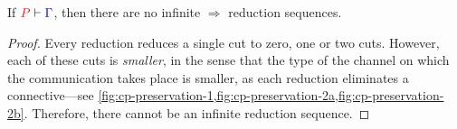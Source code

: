 \begin{theorem}[Termination]\label{thm:cp-termination}
  If $\seq[{ P }]{ \Gamma }$, then there are no infinite $\Longrightarrow$
  reduction sequences.
\end{theorem}
\begin{proof}
  Every reduction reduces a single cut to zero, one or two cuts.
  However, each of these cuts is \emph{smaller}, in the sense that the type of
  the channel on which the communication takes place is smaller, as each
  reduction eliminates a connective---see
  \cref{fig:cp-preservation-1,fig:cp-preservation-2a,fig:cp-preservation-2b}.
  Therefore, there cannot be an infinite reduction sequence.
\end{proof}
